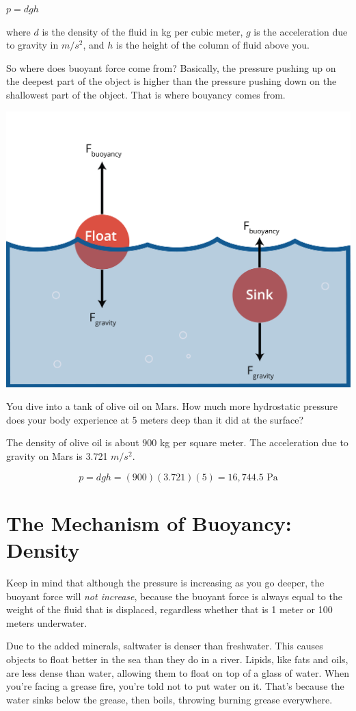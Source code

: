 $p = d g h$

where $d$ is the density of the fluid
in kg per cubic meter, $g$ is the acceleration due to gravity in
$m/s^2$, and $h$ is the height of the column of fluid above you.

So where does buoyant force come from? Basically, the pressure pushing up on the
deepest part of the object is higher than the pressure pushing down on
the shallowest part of the object. That is where bouyancy comes from.

\includegraphics[width=.6\textwidth]{buoyancy.png}

\begin{Exercise}[title={Hydrostatic Pressure}, label=mars_pressure]

  You dive into a tank of olive oil on Mars. How much more
  hydrostatic pressure does your body experience at 5 meters deep than
  it did at the surface?

  The density of olive oil is about 900 kg per square meter. The
  acceleration due to gravity on Mars is 3.721 $m/s^2$.

\end{Exercise}
\begin{Answer}[ref=mars_pressure]
$$p = d g h = (900)(3.721)(5) = 16,744.5 \text{ Pa}$$
\end{Answer}

\section{The Mechanism of Buoyancy: Density}
Keep in mind that although the pressure is increasing as you go deeper, the
buoyant force will \emph{not increase}, because the buoyant force is always equal
to the weight of the fluid that is displaced, regardless whether that is 1
meter or 100 meters underwater.

Due to the added minerals, saltwater is denser than freshwater. This causes objects to float
better in the sea than they do in a river. Lipids, like fats and
oils, are less dense than water, allowing them to float on top of a glass of water.
When you're facing a grease fire, you're told not to put water on it. That's because
the water sinks below the grease, then boils, throwing burning grease everywhere.
